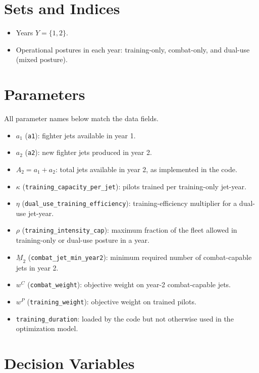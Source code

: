 \section*{Sets and Indices}

\begin{itemize}
    \item Years $Y=\{1,2\}$.
    \item Operational postures in each year: training-only, combat-only, and dual-use (mixed posture).
\end{itemize}

\section*{Parameters}

All parameter names below match the data fields.

\begin{itemize}
    \item $a_1$ (\texttt{a1}): fighter jets available in year 1.
    \item $a_2$ (\texttt{a2}): new fighter jets produced in year 2.
    \item $A_2 = a_1 + a_2$: total jets available in year 2, as implemented in the code.
    \item $\kappa$ (\texttt{training\_capacity\_per\_jet}): pilots trained per training-only jet-year.
    \item $\eta$ (\texttt{dual\_use\_training\_efficiency}): training-efficiency multiplier for a dual-use jet-year.
    \item $\rho$ (\texttt{training\_intensity\_cap}): maximum fraction of the fleet allowed in training-only or dual-use posture in a year.
    \item $\underline{M}_2$ (\texttt{combat\_jet\_min\_year2}): minimum required number of combat-capable jets in year 2.
    \item $w^C$ (\texttt{combat\_weight}): objective weight on year-2 combat-capable jets.
    \item $w^P$ (\texttt{training\_weight}): objective weight on trained pilots.
    \item \texttt{training\_duration}: loaded by the code but not otherwise used in the optimization model.
\end{itemize}

\section*{Decision Variables}

